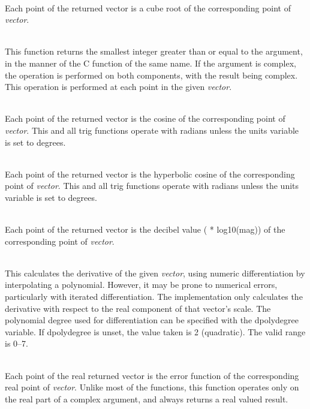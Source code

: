 \begin{description}
\item{}\\
Each point of the returned vector is a cube root of the corresponding
point of {\it vector\/}.

\item{}\\
This function returns the smallest integer greater than or equal to the
argument, in the manner of the C function of the same name.  If the
argument is complex, the operation is performed on both components,
with the result being complex.  This operation is performed at each
point in the given {\it vector}.

\item{}\\
Each point of the returned vector is the cosine of the
corresponding point of {\it vector\/}.  This and all trig functions
operate with radians unless the {\et units} variable is set to {\vt
degrees}.

\item{}\\
Each point of the returned vector is the hyperbolic cosine of the
corresponding point of {\it vector\/}.  This and all trig functions
operate with radians unless the {\et units} variable is set to {\vt
degrees}.

\item{}\\
Each point of the returned vector is the decibel value ({ *
log10(mag)}) of the corresponding point of {\it vector}.

\item{}\\
This calculates the derivative of the given {\it vector}, using
numeric differentiation by interpolating a polynomial.  However, it
may be prone to numerical errors, particularly with iterated
differentiation.  The implementation only calculates the derivative
with respect to the real component of that vector's scale.  The
polynomial degree used for differentiation can be specified with the
{\et dpolydegree} variable.  If {\et dpolydegree} is unset, the value
taken is 2 (quadratic).  The valid range is 0--7.

\item{}\\
Each point of the real returned vector is the error function of the
corresponding real point of {\it vector}.  Unlike most of the
functions, this function operates only on the real part of a complex
argument, and always returns a real valued result.


\end{description}
